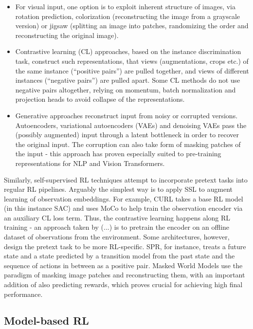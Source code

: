 \documentclass[twoside,11pt]{article}
\begin{document}
\begin{itemize}
    \item For visual input, one option is to exploit inherent structure of images, via rotation prediction, colorization (reconstructing the image from a grayscale version) or jigsaw (splitting an image into patches, randomizing the order and reconstructing the original image).
    \item Contrastive learning (CL) approaches, based on the instance discrimination task, construct such representations, that views (augmentations, crops etc.) of the same instance (``positive pairs'') are pulled together, and views of different instances (``negative pairs'') are pulled apart. Some CL methods do not use negative pairs altogether, relying on momentum, batch normalization and projection heads to avoid collapse of the representations.
    \item Generative approaches reconstruct input from noisy or corrupted versions. Autoencoders, variational autoencoders (VAEs) and denoising VAEs pass the (possibly augmented) input through a latent bottleneck in order to recover the original input. The corruption can also take form of masking patches of the input - this approach has proven especially suited to pre-training representations for NLP and Vision Transformers.
\end{itemize}

Similarly, self-supervised RL techniques attempt to incorporate pretext tasks into regular RL pipelines. Arguably the simplest way is to apply SSL to augment learning of observation embeddings. For example, CURL takes a base RL model (in this instance SAC) and uses MoCo to help train the observation encoder via an auxiliary CL loss term. Thus, the contrastive learning happens along RL training - an approach taken by (...) is to pretrain the encoder on an offline dataset of observations from the environment. Some architectures, however, design the pretext task to be more RL-specific. SPR, for instance, treats a future state and a state predicted by a transition model from the past state and the sequence of actions in between as a positive pair. Masked World Models use the paradigm of masking image patches and reconstructing them, with an important addition of also predicting rewards, which proves crucial for achieving high final performance.

\subsection{Model-based RL}
\end{document}

